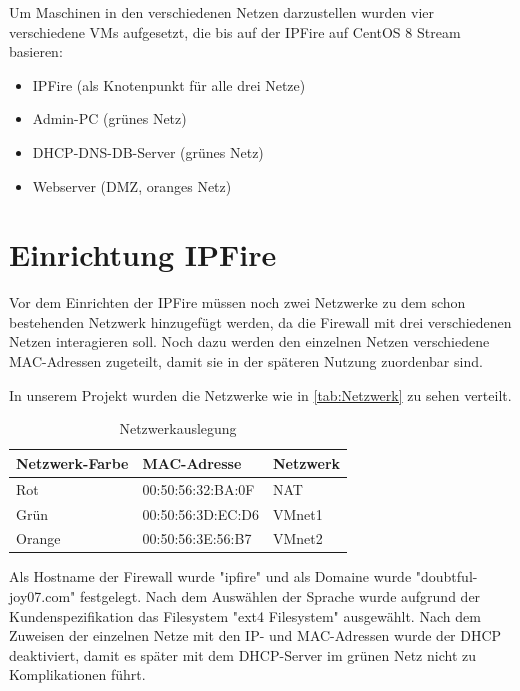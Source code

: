 \documentclass[a4paper,
    11pt,
    headings=small,
    ngerman,
    listof=totoc,
    numbers=noenddot]{scrreprt}[2021/11/13]
\begin{document}
Um Maschinen in den verschiedenen Netzen darzustellen wurden vier verschiedene \acp{VM} aufgesetzt, die bis auf der IPFire auf CentOS 8 Stream basieren:

\begin{itemize}
  \item IPFire (als Knotenpunkt für alle drei Netze)
  \item Admin-PC (grünes Netz)
  \item \ac{DHCP}-\ac{DNS}-\ac{DB}-Server (grünes Netz)
  \item Webserver (\ac{DMZ}, oranges Netz)
\end{itemize}



\section{Einrichtung IPFire}

Vor dem Einrichten der IPFire müssen noch zwei Netzwerke zu dem schon bestehenden Netzwerk hinzugefügt werden, da die Firewall mit drei verschiedenen Netzen interagieren soll. Noch dazu werden den einzelnen Netzen verschiedene MAC-Adressen zugeteilt, damit sie in der späteren Nutzung zuordenbar sind.

In unserem Projekt wurden die Netzwerke wie in \vref{tab:Netzwerk} zu sehen verteilt.

\begin{table}[htbp]
  \centering
  \renewcommand{\arraystretch}{1.25}
  \caption{Netzwerkauslegung}
  \begin{tabular}{lll}
    Netzwerk-Farbe & MAC-Adresse       & Netzwerk \\
    \hline
    Rot            & 00:50:56:32:BA:0F & NAT      \\
    Grün           & 00:50:56:3D:EC:D6 & VMnet1   \\
    Orange         & 00:50:56:3E:56:B7 & VMnet2   \\
  \end{tabular}
  \label{tab:Netzwerk}
\end{table}

Als Hostname der Firewall wurde "ipfire" und als Domaine wurde "doubtful-joy07.com" festgelegt.
Nach dem Auswählen der Sprache wurde aufgrund der Kundenspezifikation das Filesystem "ext4 Filesystem" ausgewählt. Nach dem Zuweisen der einzelnen Netze mit den IP- und MAC-Adressen wurde der \ac{DHCP} deaktiviert, damit es später mit dem \ac{DHCP}-Server im grünen Netz nicht zu Komplikationen führt.
\end{document}
